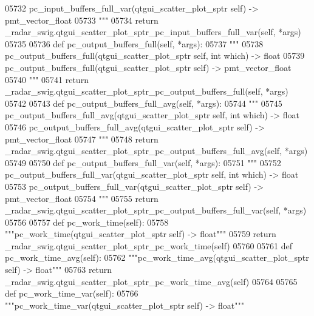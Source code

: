 \begin{DoxyCode}
{{{{{{{{{{{{{{{{{{{05732 \textcolor{stringliteral}{        pc\_input\_buffers\_full\_var(qtgui\_scatter\_plot\_sptr self) -> pmt\_vector\_float}
05733 \textcolor{stringliteral}{        """}
05734         \textcolor{keywordflow}{return} \_radar\_swig.qtgui\_scatter\_plot\_sptr\_pc\_input\_buffers\_full\_var(self, *args)
05735 
05736     \textcolor{keyword}{def }pc_output_buffers_full(self, *args):
05737         \textcolor{stringliteral}{"""}
05738 \textcolor{stringliteral}{        pc\_output\_buffers\_full(qtgui\_scatter\_plot\_sptr self, int which) -> float}
05739 \textcolor{stringliteral}{        pc\_output\_buffers\_full(qtgui\_scatter\_plot\_sptr self) -> pmt\_vector\_float}
05740 \textcolor{stringliteral}{        """}
05741         \textcolor{keywordflow}{return} \_radar\_swig.qtgui\_scatter\_plot\_sptr\_pc\_output\_buffers\_full(self, *args)
05742 
05743     \textcolor{keyword}{def }pc_output_buffers_full_avg(self, *args):
05744         \textcolor{stringliteral}{"""}
05745 \textcolor{stringliteral}{        pc\_output\_buffers\_full\_avg(qtgui\_scatter\_plot\_sptr self, int which) -> float}
05746 \textcolor{stringliteral}{        pc\_output\_buffers\_full\_avg(qtgui\_scatter\_plot\_sptr self) -> pmt\_vector\_float}
05747 \textcolor{stringliteral}{        """}
05748         \textcolor{keywordflow}{return} \_radar\_swig.qtgui\_scatter\_plot\_sptr\_pc\_output\_buffers\_full\_avg(self, *args)
05749 
05750     \textcolor{keyword}{def }pc_output_buffers_full_var(self, *args):
05751         \textcolor{stringliteral}{"""}
05752 \textcolor{stringliteral}{        pc\_output\_buffers\_full\_var(qtgui\_scatter\_plot\_sptr self, int which) -> float}
05753 \textcolor{stringliteral}{        pc\_output\_buffers\_full\_var(qtgui\_scatter\_plot\_sptr self) -> pmt\_vector\_float}
05754 \textcolor{stringliteral}{        """}
05755         \textcolor{keywordflow}{return} \_radar\_swig.qtgui\_scatter\_plot\_sptr\_pc\_output\_buffers\_full\_var(self, *args)
05756 
05757     \textcolor{keyword}{def }pc_work_time(self):
05758         \textcolor{stringliteral}{"""pc\_work\_time(qtgui\_scatter\_plot\_sptr self) -> float"""}
05759         \textcolor{keywordflow}{return} \_radar\_swig.qtgui\_scatter\_plot\_sptr\_pc\_work\_time(self)
05760 
05761     \textcolor{keyword}{def }pc_work_time_avg(self):
05762         \textcolor{stringliteral}{"""pc\_work\_time\_avg(qtgui\_scatter\_plot\_sptr self) -> float"""}
05763         \textcolor{keywordflow}{return} \_radar\_swig.qtgui\_scatter\_plot\_sptr\_pc\_work\_time\_avg(self)
05764 
05765     \textcolor{keyword}{def }pc_work_time_var(self):
05766         \textcolor{stringliteral}{"""pc\_work\_time\_var(qtgui\_scatter\_plot\_sptr self) -> float"""}
}}}}}}}}}}}}}}}}}}}
\end{DoxyCode}
